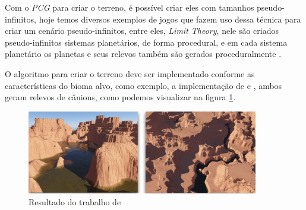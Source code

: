 Com o \textit{PCG} para criar o terreno, é possível criar eles com tamanhos
pseudo-infinitos, hoje temos diversos exemplos de jogos que fazem uso dessa técnica
para criar um cenário pseudo-infinitos, entre eles, \textit{Limit Theory}, nele
são criados pseudo-infinitos sistemas planetários, de forma procedural, e em cada
sistema planetário os planetas e seus relevos também são gerados proceduralmente
\cite{abreu1990toward}.

O algoritmo para criar o terreno deve ser implementado conforme as
características do bioma alvo, como exemplo, a implementação de 
\cite{gabrielle2016canion} e \cite{carli2012canion}, ambos geram relevos de
cânions, como podemos visualizar na figura \ref{fig:carli2012result}.
\begin{figure}[H]
    \centering
    \includegraphics[width=0.9\textwidth]{figuras/carli2012result.png}
    \caption{Resultado do trabalho de \cite{carli2012canion}}
    \label{fig:carli2012result}
\end{figure}

